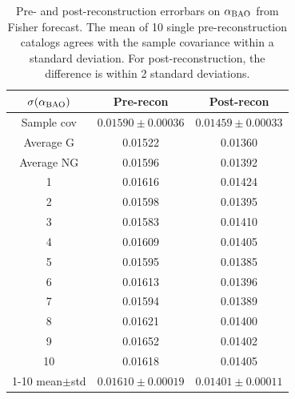 \begin{table}
\centering
\begin{tabular}{|c|c|c|}
\hline
$\sigma(\alpha_{\rm BAO})$ & Pre-recon & Post-recon \\
\hline
Sample cov & $0.01590 \pm 0.00036$ & $0.01459 \pm 0.00033$ \\
\hline
Average G & 0.01522 & 0.01360 \\
Average NG & 0.01596 & 0.01392 \\
\hline
1 & 0.01616 & 0.01424 \\
2 & 0.01598 & 0.01395 \\
3 & 0.01583 & 0.01410 \\
4 & 0.01609 & 0.01405 \\
5 & 0.01595 & 0.01385 \\
6 & 0.01613 & 0.01396 \\
7 & 0.01594 & 0.01389 \\
8 & 0.01621 & 0.01400 \\
9 & 0.01652 & 0.01402 \\
10 & 0.01618 & 0.01405 \\
\hline
1-10 mean$\pm$std & $0.01610 \pm 0.00019$ & $0.01401 \pm 0.00011$ \\
\hline
\end{tabular}
\caption[Errorbars on the BAO isotropic scale parameter obtained from different covariances for the \desimtwo{} mocks]{Pre- and post-reconstruction errorbars on $\alpha_{\rm BAO}$ from Fisher forecast.
The mean of 10 single pre-reconstruction catalogs agrees with the sample covariance within a standard deviation.
For post-reconstruction, the difference is within 2 standard deviations.
}
\label{tab:sigma_alpha-pre-post}
\end{table}

